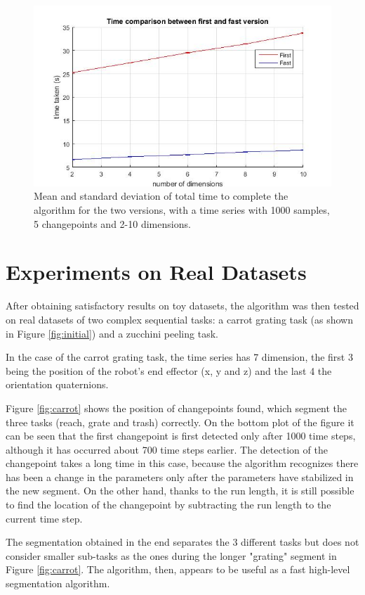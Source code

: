 \documentclass[11pt,twoside,a4paper]{report}
\begin{document}
\begin{figure} [h]
\centering
\includegraphics[width=.8\textwidth]{plot_time.jpg}
\caption{Mean and standard deviation of total time to complete the algorithm for the two versions, with a time series with 1000 samples, 5 changepoints and 2-10 dimensions.}
\label{fig:timeDim}
\end{figure}

\section{Experiments on Real Datasets}

After obtaining satisfactory results on toy datasets, the algorithm was then tested on real datasets of two complex sequential tasks: a carrot grating task (as shown in Figure \ref{fig:initial}) and a zucchini peeling task. 

In the case of the carrot grating task, the time series has 7 dimension, the first 3 being the position of the robot's end effector (x, y and z) and the last 4 the orientation quaternions.

Figure \ref{fig:carrot} shows the position of changepoints found, which segment the three tasks (reach, grate and trash) correctly. On the bottom plot of the figure it can be seen that the first changepoint is first detected only after 1000 time steps, although it has occurred about 700 time steps earlier. The detection of the changepoint takes a long time in this case, because the algorithm recognizes there has been a change in the parameters only after the parameters have stabilized in the new segment. On the other hand, thanks to the run length, it is still possible to find the location of the changepoint by subtracting the run length to the current time step.

The segmentation obtained in the end separates the 3 different tasks but does not consider smaller sub-tasks as the ones during the longer "grating" segment in Figure \ref{fig:carrot}. The algorithm, then, appears to be useful as a fast high-level segmentation algorithm.
\end{document}
